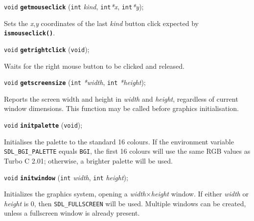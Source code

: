 \documentclass[a4paper,12pt]{article}
\newcommand{\V}{\texttt{void}}      %
\newcommand{\I}{\texttt{int}}       %
\newcommand{\func}[1]{\textbf{\texttt{#1}}}  %
\newcommand{\A}[1]{\emph{#1}}       %
\newcommand{\T}[1]{\texttt{#1}}     %
\newenvironment{bgi}
{ %
  \begin{snugshade}
}
{ %
  \end{snugshade}
}
\begin{document}
\begin{bgi}
\V{} \func{getmouseclick} (\I{} \A{kind}, \I{}\A{*x}, \I{}\A{*y});
\end{bgi}

Sets the \A{x},\A{y} coordinates of the last \A{kind} button click
expected by \func{ismouseclick()}.


\label{sec:getrightclick}

\begin{bgi}
\V{} \func{getrightclick} (\V{});
\end{bgi}

Waits for the right mouse button to be clicked and released.


\label{sec:getscreensize}

\begin{bgi}
\V{} \func{getscreensize} (\I{} \A{*width}, \I{} \A{*height});
\end{bgi}

Reports the screen width and height in \A{width} and \A{height},
regardless of current window dimensions. This function may be called
before graphics initialisation.


\label{sec:initpalette}

\begin{bgi}
\V{} \func{initpalette} (\V{});
\end{bgi}

Initialises the palette to the standard 16 colours. If the environment
variable \T{SDL\_BGI\_PALET\-TE} equals \T{BGI}, the first 16 colours
will use the same RGB values as Turbo C 2.01; otherwise, a brighter
palette will be used.


\label{sec:initwindow}

\begin{bgi}
\V{} \func{initwindow} (\I{} \A{width}, \I{} \A{height});
\end{bgi}

Initializes the graphics system, opening a \A{width}$\times$\A{height}
window. If either \A{width} or \A{height} is 0, then
\T{SDL\-\_FULL\-SCREEN} will be used. Multiple windows can be created,
unless a fullscreen window is already present.
\end{document}
